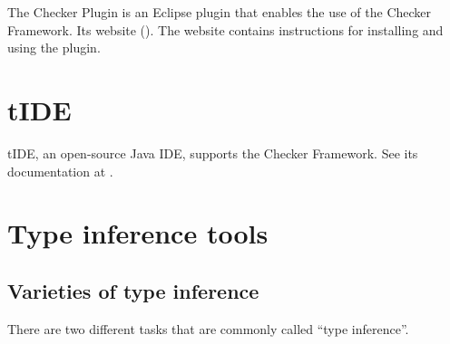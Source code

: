 The Checker Plugin is an Eclipse plugin that enables the use of the Checker
Framework.
Its website ().
The website contains instructions for installing and using the plugin.


\section{tIDE\label{tide}}

\begin{sloppypar}
tIDE, an open-source Java IDE, supports the Checker Framework.  See its
documentation at .
\end{sloppypar}


\section{Type inference tools\label{type-inference-tools}}

\subsection{Varieties of type inference}

There are two different tasks that are commonly called ``type inference''.

